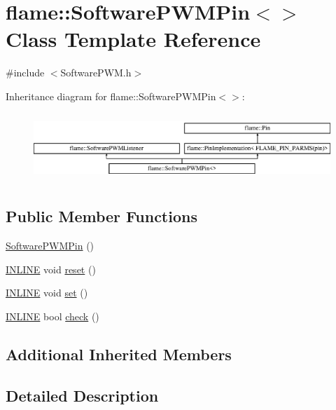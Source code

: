 \hypertarget{classflame_1_1_software_p_w_m_pin}{\section{flame\-:\-:Software\-P\-W\-M\-Pin$<$$>$ Class Template Reference}
\label{classflame_1_1_software_p_w_m_pin}
}


{\ttfamily \#include $<$Software\-P\-W\-M.\-h$>$}

Inheritance diagram for flame\-:\-:Software\-P\-W\-M\-Pin$<$$>$\-:\begin{figure}[H]
\begin{center}
\leavevmode
\includegraphics[height=2.616822cm]{classflame_1_1_software_p_w_m_pin}
\end{center}
\end{figure}
\subsection*{Public Member Functions}
\begin{DoxyCompactItemize}
\item 
\hyperlink{classflame_1_1_software_p_w_m_pin_aaba6d2dd4b849975d80f9bfddd4a4b7a}{Software\-P\-W\-M\-Pin} ()
\item 
\hyperlink{io_8h_a2eb6f9e0395b47b8d5e3eeae4fe0c116}{I\-N\-L\-I\-N\-E} void \hyperlink{classflame_1_1_software_p_w_m_pin_a51b59f964716b33518510345252da74f}{reset} ()
\item 
\hyperlink{io_8h_a2eb6f9e0395b47b8d5e3eeae4fe0c116}{I\-N\-L\-I\-N\-E} void \hyperlink{classflame_1_1_software_p_w_m_pin_a9d744a25930b0bbaf6fe220f1adc9f41}{set} ()
\item 
\hyperlink{io_8h_a2eb6f9e0395b47b8d5e3eeae4fe0c116}{I\-N\-L\-I\-N\-E} bool \hyperlink{classflame_1_1_software_p_w_m_pin_aa87439920593e3e06605722f5d707e22}{check} ()
\end{DoxyCompactItemize}
\subsection*{Additional Inherited Members}


\subsection{Detailed Description}
